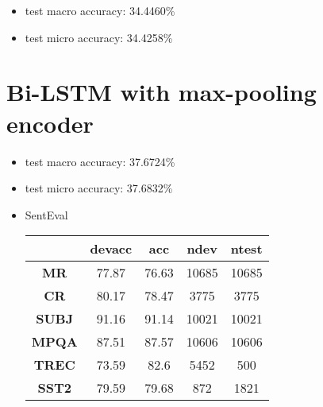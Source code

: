 \documentclass[6pt]{article}
\begin{document}
\begin{itemize}
  \item test macro accuracy: 34.4460\%
  
  \item test micro accuracy: 34.4258\%
\end{itemize}

\section{Bi-LSTM with max-pooling encoder}

\begin{itemize}
  \item test macro accuracy: 37.6724\%
  
  \item test micro accuracy: 37.6832\%
  
  \item SentEval

  \begin{center}
    \begin{tabular}{| c |c | c | c | c|} 
        \hline
        & \textbf{devacc} & \textbf{acc} & \textbf{ndev} & \textbf{ntest} \\ 
        \hline
        \textbf{MR} & 77.87 & 76.63 & 10685 & 10685 \\ 
        \hline
        \textbf{CR} & 80.17 & 78.47 & 3775 & 3775 \\
        \hline
        \textbf{SUBJ} & 91.16 & 91.14 & 10021 & 10021 \\
        \hline
        \textbf{MPQA} & 87.51 & 87.57 & 10606 & 10606 \\
        \hline
        \textbf{TREC} & 73.59 & 82.6 & 5452 & 500 \\
        \hline
        \textbf{SST2} & 79.59 & 79.68 & 872 & 1821 \\
        \hline
      \end{tabular}
    \end{center}
\end{itemize}
\end{document}
